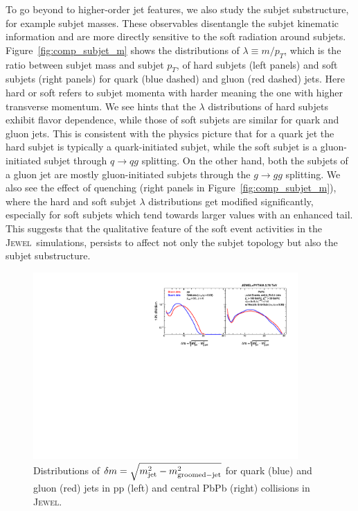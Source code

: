 \documentclass[notoc,preprintnumbers]{JHEP3}
\newcommand{\jw}{\textsc{Jewel}~}
\begin{document}
To go beyond to higher-order jet features, we also study the subjet substructure, for example subjet masses. These observables disentangle the subjet kinematic information and are more directly sensitive to the soft radiation around subjets. Figure~\ref{fig:comp_subjet_m} shows the distributions of $\lambda\equiv m/p_T$, which is the ratio between subjet mass and subjet $p_T$, of hard subjets (left panels) and soft subjets (right panels) for quark (blue dashed) and gluon (red dashed) jets. Here hard or soft refers to subjet momenta with harder meaning the one with higher transverse momentum. We see hints that the $\lambda$ distributions of hard subjets exhibit flavor dependence, while those of soft subjets are similar for quark and gluon jets. This is consistent with the physics picture that for a quark jet the hard subjet is typically a quark-initiated subjet, while the soft subjet is a gluon-initiated subjet through $q\rightarrow qg$ splitting. On the other hand, both the subjets of a gluon jet are mostly gluon-initiated subjets through the $g\rightarrow gg$ splitting. We also see the effect of quenching (right panels in Figure~\ref{fig:comp_subjet_m}), where the hard and soft subjet $\lambda$ distributions get modified significantly, especially for soft subjets which tend towards larger values with an enhanced tail. This suggests that the qualitative feature of the soft event activities in the \jw simulations, persists to affect not only the subjet topology but also the subjet substructure.

\begin{figure}[t]
	   \centering
	   \includegraphics[width=0.9\textwidth]{Fig9}
	   \caption{Distributions of $\delta m=\sqrt{m_{\rm jet}^2-m_{\rm groomed-jet}^2}$ for quark (blue) and gluon (red) jets in pp (left) and central PbPb (right) collisions in \textsc{Jewel}.}
\label{fig:comp_delta_m2}
\end{figure}
\end{document}
